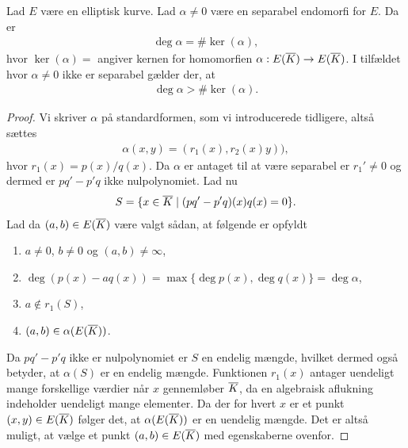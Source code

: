 \begin{proposition}
\label{deg_to_ker}
Lad $E$ være en elliptisk kurve. Lad $\alpha \neq 0$ være en separabel 
endomorfi for $E$. Da er 
\begin{align*}
	\deg \alpha = \# \ker (\alpha),
\end{align*}
hvor $\ker (\alpha) = $ angiver kernen for homomorfien 
$\alpha : E(\overline{K}) \to E(\overline{K})$. I tilfældet hvor $\alpha \neq 0$ ikke
er separabel gælder der, at 
\begin{align*}
	\deg \alpha > \# \ker (\alpha).
\end{align*}
\end{proposition}
\begin{proof}
Vi skriver $\alpha$ på standardformen, som vi introducerede tidligere, altså
sættes
\begin{align*}
	\alpha(x, y) = (r_1(x), r_2(x) y)),
\end{align*}
hvor $r_1(x) = p(x)/q(x)$. Da $\alpha$ er antaget til at være separabel er 
$r_1' \neq 0$ og dermed er $pq'-p'q$ ikke nulpolynomiet. Lad nu
\begin{align*}
	S = \{ x \in \overline{K} \mid (pq' - p'q)(x)q(x) = 0 \}.
\end{align*}
Lad da $(a, b) \in E(\overline{K})$ være valgt sådan, at følgende er opfyldt
\begin{enumerate}
	\item $a \neq 0$, $b \neq 0$ og $(a, b) \neq \infty$,
	\item $\deg (p(x) - aq(x)) = \max \{ \deg p(x), \deg q(x) \} = \deg \alpha$,
	\item $a \notin r_1(S)$,
	\item $(a, b) \in \alpha(E(\overline{K}))$.
\end{enumerate}
Da $pq'-p'q$ ikke er 
nulpolynomiet er $S$ en endelig mængde, hvilket dermed også betyder, at 
$\alpha(S)$ er en endelig mængde. Funktionen $r_1(x)$ antager uendeligt 
mange forskellige værdier når $x$ gennemløber $\overline{K}$, da en algebraisk aflukning indeholder uendeligt mange elementer.
Da der for hvert $x$ er et punkt $(x, y) \in E(\overline{K})$ følger det, at 
$\alpha(E(\overline{K}))$ er en uendelig mængde. Det er altså muligt, at vælge et
punkt $(a, b) \in E(\overline{K})$ med egenskaberne ovenfor.


\end{proof}
